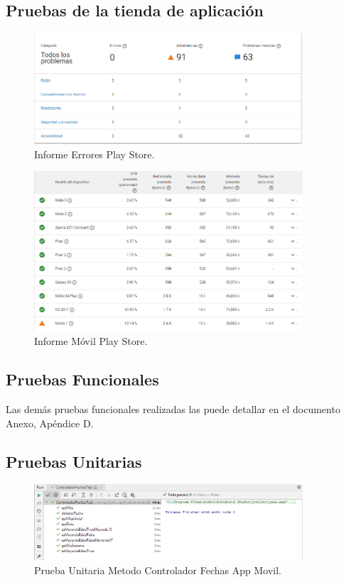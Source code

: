 \documentclass[12pt,letterpaper,openany]{book}
\begin{document}
\subsection{Pruebas de la tienda de aplicación}
\begin{figure}[H]
\begin{center}
\includegraphics[width=10cm]{./imagenes/Test/Informe_errores_play_store}
\caption{Informe Errores Play Store.}
\end{center}
\end{figure}

\begin{figure}[H]
\begin{center}
\includegraphics[width=10cm]{./imagenes/Test/Informe_movile_play_console}
\caption{Informe Móvil Play Store.}
\end{center}
\end{figure}

\subsection{Pruebas Funcionales}
Las demás pruebas funcionales realizadas las puede detallar en el documento Anexo, Apéndice D.

\subsection{Pruebas Unitarias}
\begin{figure}[H]
\begin{center}
\includegraphics[width=10cm]{./imagenes/Test/ControladorFechasTest}
\caption{Prueba Unitaria Metodo Controlador Fechas App Movil.}
\end{center}
\end{figure}
\end{document}
